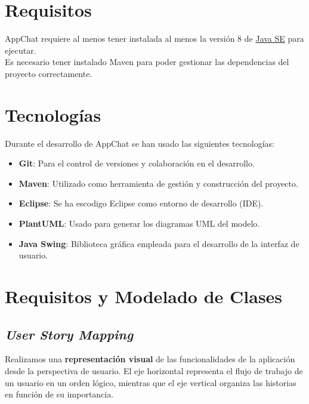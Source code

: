 \documentclass[11pt]{article}
\begin{document}
\section{Requisitos}

AppChat requiere al menos tener instalada al menos la versión 8 de \href{https://www.oracle.com/java/technologies/javase/javase8-archive-downloads.html}{Java SE} para ejecutar.\\

Es necesario tener instalado Maven para poder gestionar las dependencias del proyecto correctamente.

\section{Tecnologías}

Durante el desarrollo de AppChat se han usado las siguientes tecnologías:

\begin{itemize}
	\item \textbf{Git}: Para el control de versiones y colaboración en el desarrollo.
	\item \textbf{Maven}: Utilizado como herramienta de gestión y construcción del proyecto.
	\item \textbf{Eclipse}: Se ha escodigo Eclipse como entorno de desarrollo (IDE).
	\item \textbf{PlantUML}: Usado para generar los diagramas UML del modelo.
	\item \textbf{Java Swing}: Biblioteca gráfica empleada para el desarrollo de la interfaz de usuario.
\end{itemize}

\clearpage

\section{Requisitos y Modelado de Clases}

\subsection{\textit{User Story Mapping}}

Realizamos una \textbf{representación visual} de las funcionalidades de la aplicación desde la perspectiva de usuario. El eje horizontal representa el flujo de trabajo de un usuario en un orden lógico, mientras que el eje vertical organiza las historias en función de su importancia.
\end{document}
